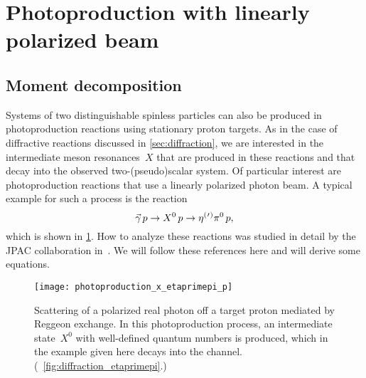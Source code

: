 \section{Photoproduction with linearly polarized beam}%
\label{sec:photoprod}

\subsection{Moment decomposition}%
\label{sec:photoprod:moment}

Systems of two distinguishable spinless particles can also be produced
in photoproduction reactions using stationary proton targets.  As in
the case of diffractive reactions discussed in \cref{sec:diffraction},
we are interested in the intermediate meson resonances~$X$ that are
produced in these reactions and that decay into the observed
two-(pseudo)scalar system.  Of particular interest are photoproduction
reactions that use a linearly polarized photon beam.  A typical
example for such a process is the reaction
\begin{equation}
  \label{eq:etaOrPr_pi_photoprod}
  \vec{\gamma}\, p \to X^0\, p \to \etaOrPr\pi^0\, p,
\end{equation}
which is shown in \cref{fig:photoprod_etaprimepi}.  How to analyze
these reactions was studied in detail by the JPAC collaboration
in~.  We will follow these
references here and will derive some equations.

\begin{figure}[bp]
  \centering%
  \texttt{[image: photoproduction\_x\_etaprimepi\_p]}%
  \caption{Scattering of a polarized real photon off a target proton
  mediated by Reggeon exchange.  In this photoproduction process, an
  intermediate state~$X^0$ with well-defined quantum numbers is
  produced, which in the example given here decays into the
  \etaOrPrPim channel.  (\Confer~\cref{fig:diffraction_etaprimepi}.)}%
  \label{fig:photoprod_etaprimepi}%
\end{figure}

